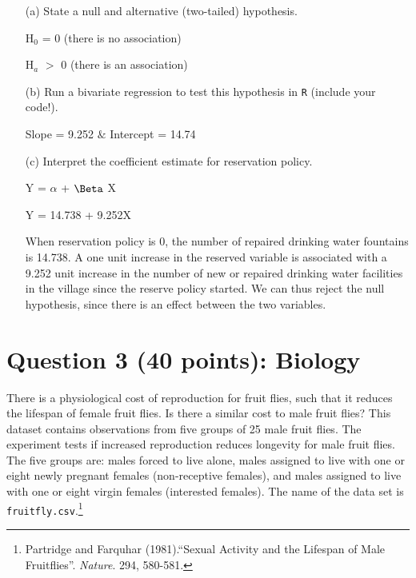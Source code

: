\documentclass[12pt,letterpaper]{article}
\begin{document}
\begin{enumerate}
	\item [(a)] State a null and alternative (two-tailed) hypothesis.
	 
	\vspace{.25cm}
	
	H$_0$ = 0 (there is no association)
	\vspace{.15cm}
	
	H$_a$ $>$ 0 (there is an association)
	
	\vspace{.5cm}
	\item [(b)] Run a bivariate regression to test this hypothesis in \texttt{R} (include your code!).
	  
	
	Slope = 9.252 $\&$ Intercept = 14.74
	
	\vspace{1cm}
	\item [(c)] Interpret the coefficient estimate for reservation policy.
	 \vspace{.25cm}
	 
	Y = $\alpha$ + $\Beta$ X
	
	\vspace{.15cm}
	
	Y = 14.738 + 9.252X
	
	\vspace{.15cm}
	
	 When reservation policy is 0, the number of repaired drinking water fountains is 14.738. A one unit increase in the reserved variable is associated with a 9.252 unit increase in the number of new or repaired drinking water facilities in the village since the reserve policy started. We can thus reject the null hypothesis, since there is an effect between the two variables.

\end{enumerate}


	\section*{Question 3 (40 points): Biology}

There is a physiological cost of reproduction for fruit flies, such that it reduces the lifespan of female fruit flies.  Is there a similar cost to male fruit flies?  This dataset contains observations from five groups of 25 male fruit flies. The experiment tests if increased reproduction reduces longevity for male fruit flies. The five groups are: males forced to live alone, males assigned to live with one or eight newly pregnant females (non-receptive females), and males assigned to live with one or eight virgin females (interested females). The name of the data set is \texttt{fruitfly.csv}.\footnote{Partridge and Farquhar (1981).``Sexual Activity and the Lifespan of Male Fruitflies''. \textit{Nature}. 294, 580-581.}
	\vspace{1cm}
\end{document}
